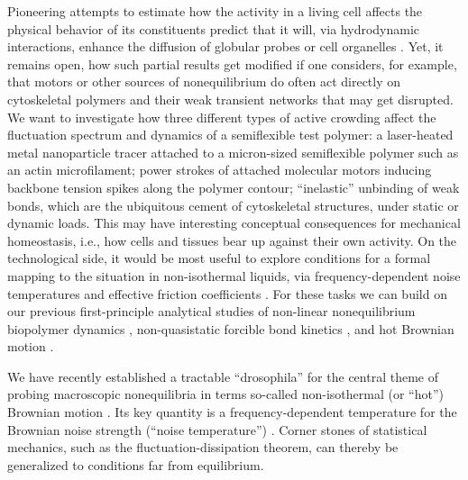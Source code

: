 \begin{workpackage}[id=WPactive,wphases=0-48,
  short=Active Particle Suspensions,%
  title=Probing Active Particle Suspensions with Colloids and Polymers,
  lead=ULEI,
  ULEIRM=96,UNIPDRM=6,USTUTTRM=2]
\begin{tasklist}
\begin{task}[title=Active Crowding,id=task2,lead=ULEI,wphases=0-48!0.5]
Pioneering attempts to estimate how the activity in a living cell affects the physical behavior
of its constituents predict that it will, via hydrodynamic interactions, enhance the diffusion of
globular probes or cell organelles \cite{mikhailov-kapral:2015}.
%
Yet, it remains open, how such partial results get modified if one considers, for example, that motors or
other sources of nonequilibrium do often act directly on cytoskeletal polymers and their
weak transient networks that may get disrupted.
%
We want to  investigate how three different types of active
crowding affect the fluctuation spectrum and dynamics of a semiflexible test polymer: a
laser-heated metal nanoparticle tracer attached to a micron-sized semiflexible polymer such
as an actin microfilament; power strokes of attached molecular
motors inducing backbone tension spikes along the polymer contour; ``inelastic'' \cite{gralka-kroy:2015}
unbinding of weak bonds, which are the ubiquitous cement of
cytoskeletal structures, under static or dynamic loads.
%
This may have interesting conceptual consequences for mechanical homeostasis, i.e., how cells and tissues bear up against 
their own activity.   
%
On the technological side, it would be most useful to explore conditions for a formal mapping to the situation in 
non-isothermal liquids, via frequency-dependent noise temperatures and 
effective friction coefficients \cite{falasco-etal:2014}.
%
For these tasks we can build on our previous first-principle analytical studies
of non-linear nonequilibrium biopolymer dynamics \cite{otto-etal:2013}, non-quasistatic forcible 
bond kinetics \cite{bullerjahn-sturm-kroy:2014}, and hot Brownian motion 
\cite{rings-etal:2010,falasco-etal:2014}.

\end{task}


\begin{task}[title=Noise Temperature,id=task3,lead=ULEI,wphases=0-24!0.5]
We have recently established a tractable ``drosophila'' for the central theme of probing 
macroscopic nonequilibria in terms so-called non-isothermal (or ``hot'') Brownian motion \cite{rings-etal:2010}.
%
Its key quantity is a frequency-dependent temperature for the Brownian noise 
strength (``noise temperature'') \cite{falasco-etal:2014}.
%
Corner stones of statistical mechanics, such as the fluctuation-dissipation theorem, can
thereby be generalized to conditions far from equilibrium.  


\end{task}
\end{tasklist}
\end{workpackage}
